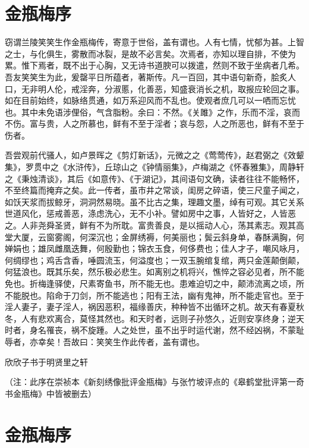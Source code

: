 \documentclass[a4paper,12pt,UTF8,twoside]{ctexbook}
\begin{document}
\chapter{金瓶梅序}

窃谓兰陵笑笑生作金瓶梅传，寄意于世俗，盖有谓也。人有七情，忧郁为甚。上智之士，与化俱生，雾散而冰裂，是故不必言矣。次焉者，亦知以理自排，不使为累。惟下焉者，既不出于心胸，又无诗书道腴可以拨遣，然则不致于坐病者几希。吾友笑笑生为此，爰罄平日所蕴者，著斯传。凡一百回，其中语句新奇，脍炙人口，无非明人伦，戒淫奔，分淑慝，化善恶，知盛衰消长之机，取报应轮回之事。如在目前始终，如脉络贯通，如万系迎风而不乱也。使观者庶几可以一哂而忘忧也。其中未免语涉俚俗，气含脂粉。余曰：不然。《关雎》之作，乐而不淫，哀而不伤。富与贵，人之所慕也，鲜有不至于淫者；哀与怨，人之所恶也，鲜有不至于伤者。

吾尝观前代骚人，如卢景晖之《剪灯新话》，元微之之《莺莺传》，赵君弼之《效颦集》，罗贯中之《水浒传》，丘琼山之《钟情丽集》，卢梅湖之《怀春雅集》，周静轩之《秉烛清谈》，其后《如意传》、《于湖记》，其间语句文确，读者往往不能畅怀，不至终篇而掩弃之矣。此一传者，虽市井之常谈，闺房之碎语，使三尺童子闻之，如饫天浆而拔鲸牙，洞洞然易晓。虽不比古之集，理趣文墨，绰有可观。其它关系世道风化，惩戒善恶，涤虑洗心，无不小补。譬如房中之事，人皆好之，人皆恶之。人非尧舜圣贤，鲜有不为所耽。富贵善良，是以摇动人心，荡其素志。观其高堂大厦，云窗雾阁，何深沉也；金屏绣褥，何美丽也；鬓云斜身单，春酥满胸，何婵娟也；雄凤雌凰迭舞，何殷勤也；锦衣玉食，何侈费也；佳人才子，嘲风咏月，何绸缪也；鸡舌含香，唾圆流玉，何溢度也；一双玉腕绾复绾，两只金莲颠倒颠，何猛浪也。既其乐矣，然乐极必悲生。如离别之机将兴，憔悴之容必见者，所不能免也。折梅逢驿使，尺素寄鱼书，所不能无也。患难迫切之中，颠沛流离之顷，所不能脱也。陷命于刀剑，所不能逃也；阳有王法，幽有鬼神，所不能走官也。至于淫人妻子，妻子淫人，祸因恶积，福缘善庆，种种皆不出循环之机。故天有春夏秋冬，人有悲欢离合，莫怪其然也。和天时者，远则子孙悠久，近则安享终身；逆天时者，身名罹丧，祸不旋踵。人之处世，虽不出乎时运代谢，然不经凶祸，不蒙耻辱者，亦幸矣！吾故曰：笑笑生作此传者，盖有谓也。

欣欣子书于明贤里之轩

（注：此序在崇祯本《新刻绣像批评金瓶梅》与张竹坡评点的《皋鹤堂批评第一奇书金瓶梅》中皆被删去）

\chapter{金瓶梅序}
\end{document}
